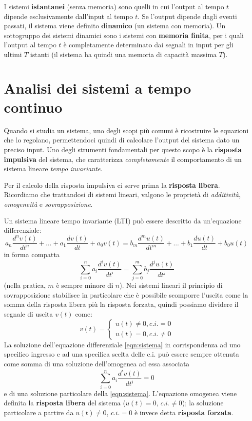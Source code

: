 \documentclass[a4paper, titlepage, oneside]{scrbook}
\begin{document}
I sistemi \textbf{istantanei} (senza memoria) sono quelli in cui l'output al tempo $t$ dipende esclusivamente dall'input al tempo $t$.
Se l'output dipende dagli eventi passati, il sistema viene definito \textbf{dinamico} (un sistema con memoria).
Un sottogruppo dei sistemi dinamici sono i sistemi con \textbf{memoria finita}, per i quali l'output al tempo $t$ è completamente determinato
dai segnali in input per gli ultimi $T$ istanti (il sistema ha quindi una memoria di capacità massima $T$).

\chapter{Analisi dei sistemi a tempo continuo}
Quando si studia un sistema, uno degli scopi più comuni è ricostruire le equazioni che lo regolano, permettendoci quindi di calcolare l'output del sistema dato un preciso input.
Uno degli strumenti fondamentali per questo scopo è la \textbf{risposta impulsiva} del sistema, che caratterizza \textit{completamente} il comportamento di un sistema lineare \textit{tempo invariante}.

Per il calcolo della risposta impulsiva ci serve prima la \textbf{risposta libera}.
Ricordiamo che trattandosi di sistemi lineari, valgono le proprietà di \textit{additività}, \textit{omogeneità} e \textit{sovrapposizione}.

Un sistema lineare tempo invariante (LTI) può essere descritto da un'equazione differenziale:
$$
	a_n\frac{d^nv(t)}{dt^n} + \ldots + a_1\frac{dv(t)}{dt} + a_0v(t) = b_m\frac{d^mu(t)}{dt^m} + \ldots + b_1\frac{du(t)}{dt} + b_0u(t)
$$
in forma compatta
\begin{equation}
	\sum_{i=0}^{n}a_i\frac{d^iv(t)}{dt^i} = \sum_{j=0}^{m}b_j\frac{d^ju(t)}{dt^j}
	\label{eqn:sistema}
\end{equation}
(nella pratica, $m$ è sempre minore di $n$).
Nei sistemi lineari il principio di sovrapposizione stabilisce in particolare che è possibile scomporre l'uscita come la somma della risposta libera più la risposta forzata, quindi possiamo dividere il segnale di uscita $v(t)$ come:
$$
	v(t)=
		\begin{cases}
		u(t) \ne 0, c.i. = 0\\
		u(t) = 0, c.i. \ne 0
		\end{cases}
$$
La soluzione dell'equazione differenziale \ref{eqn:sistema} in corrispondenza ad uno specifico ingresso e ad una specifica scelta delle c.i. può essere sempre ottenuta come somma di una soluzione dell'omogenea ad essa associata
\begin{equation}
	\sum_{i=0}^{n}a_i\frac{d^iv(t)}{dt^i}=0
	\label{eqn:omogenea_associata}
\end{equation}
e di una soluzione particolare della \ref{eqn:sistema}.
L'equazione omogenea viene definita la \textbf{risposta libera} del sistema ($u(t)=0$, $c.i.\ne 0$); la soluzione particolare a partire da $u(t)\ne 0$, $c.i.=0$ è invece detta \textbf{risposta forzata}.
\end{document}
